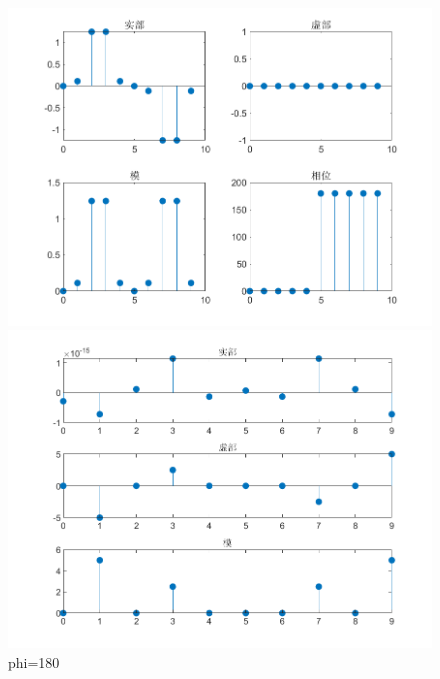 \documentclass{../source/zjureport}
\begin{document}
                \newpage

                \begin{figure}[htbp]
                    \centering
                    \begin{minipage}[t]{0.48\textwidth}
                    \centering
                    \includegraphics[width=\textwidth]{figure/复合函数序列_phi=180.png}
                    \end{minipage}
                    \begin{minipage}[t]{0.48\textwidth}
                    \centering
                    \includegraphics[width=\textwidth]{figure/频谱_复合函数序列_phi=180.png}
                    \end{minipage}
                    \caption{phi=180}
                \end{figure}
\end{document}
